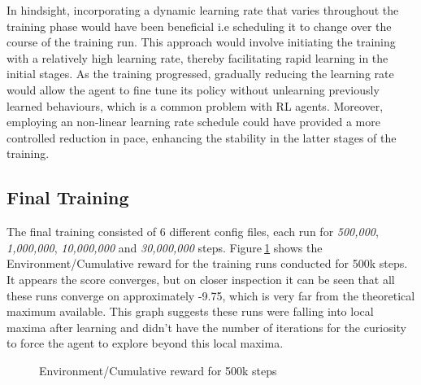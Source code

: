 In hindsight, incorporating a dynamic learning rate that varies throughout the training phase would have been beneficial i.e scheduling it to change over the course of the training run. This approach would involve initiating the training with a relatively high learning rate, thereby facilitating rapid learning in the initial stages. As the training progressed, gradually reducing the learning rate would allow the agent to fine tune its policy without unlearning previously learned behaviours, which is a common problem with RL agents. Moreover, employing an non-linear learning rate schedule could have provided a more controlled reduction in pace, enhancing the stability in the latter stages of the training. 



\subsection{Final Training}

The final training consisted of 6 different config files, each run for \textit{500,000}, \textit{1,000,000}, \textit{10,000,000} and \textit{30,000,000} steps. Figure$~$\ref{500k_steps} shows the Environment/Cumulative reward for the training runs conducted for 500k steps. It appears the score converges, but on closer inspection it can be seen that all these runs converge on approximately -9.75, which is very far from the theoretical maximum available. This graph suggests these runs were falling into local maxima after learning and didn't have the number of iterations for the curiosity to force the agent to explore beyond this local maxima.
\begin{figure}[!htb]
    \centering
    \caption{Environment/Cumulative reward for 500k steps}\label{500k_steps}
\end{figure}

